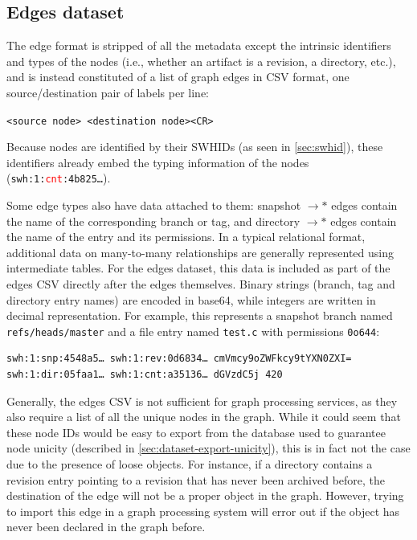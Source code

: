 \subsection{Edges dataset}%
\label{sec:edges-format}
The edge format is stripped of all the metadata except the intrinsic
identifiers and types of the nodes (i.e., whether an artifact is a revision, a
directory, etc.), and is instead constituted of a list of graph edges in CSV
format, one source/destination pair of labels per line:

\texttt{<source node> <destination node><CR>}

Because nodes are identified by their \glspl{SWHID} (as seen in
\cref{sec:swhid}), these identifiers already embed the typing
information of the nodes (\texttt{swh:1:\textcolor{red}{cnt}:4b825…}).

Some edge types also have data attached to them: snapshot $\rightarrow\ast$
edges contain the name of the corresponding branch or tag, and
directory $\rightarrow\ast$ edges contain the name of the entry and its
permissions.
In a typical relational format, additional data on many-to-many relationships
are generally represented using intermediate tables. For the edges dataset,
this data is included as part of the edges CSV directly after the edges
themselves. Binary strings (branch, tag and directory entry names) are encoded
in base64, while integers are written in decimal representation. For example,
this represents a snapshot branch named \texttt{refs/heads/master} and a file
entry named \texttt{test.c} with permissions \texttt{0o644}:

\begin{verbatim}
swh:1:snp:4548a5… swh:1:rev:0d6834… cmVmcy9oZWFkcy9tYXN0ZXI=
swh:1:dir:05faa1… swh:1:cnt:a35136… dGVzdC5j 420
\end{verbatim}

Generally, the edges CSV is not sufficient for graph processing services, as
they also require a list of all the unique nodes in the graph. While it could
seem that these node IDs would be easy to export from the database used to
guarantee node unicity (described in \cref{sec:dataset-export-unicity}),
this is in fact not the case due to the presence of loose objects. For
instance, if a directory contains a revision entry pointing to a revision that
has never been archived before, the destination of the edge will not be a
proper object in the graph. However, trying to import this edge in a graph
processing system will error out if the object has never been declared in the
graph before.

